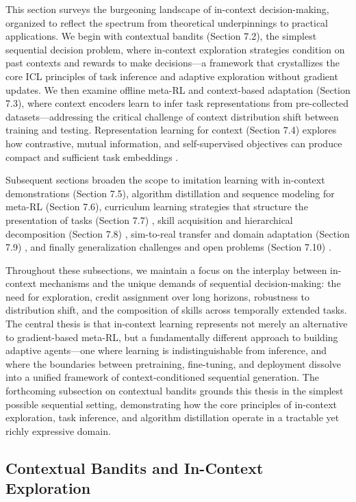 \documentclass[11pt]{article}
\begin{document}
This section surveys the burgeoning landscape of in-context decision-making, organized to reflect the spectrum from theoretical underpinnings to practical applications. We begin with contextual bandits (Section 7.2), the simplest sequential decision problem, where in-context exploration strategies condition on past contexts and rewards to make decisions---a framework that crystallizes the core ICL principles of task inference and adaptive exploration without gradient updates. We then examine offline meta-RL and context-based adaptation (Section 7.3), where context encoders learn to infer task representations from pre-collected datasets---addressing the critical challenge of context distribution shift between training and testing. Representation learning for context (Section 7.4) explores how contrastive, mutual information, and self-supervised objectives can produce compact and sufficient task embeddings \cite{ref318,ref312}.

Subsequent sections broaden the scope to imitation learning with in-context demonstrations (Section 7.5), algorithm distillation and sequence modeling for meta-RL (Section 7.6), curriculum learning strategies that structure the presentation of tasks (Section 7.7) \cite{ref319,ref320}, skill acquisition and hierarchical decomposition (Section 7.8) \cite{ref321}, sim-to-real transfer and domain adaptation (Section 7.9) \cite{ref322}, and finally generalization challenges and open problems (Section 7.10) \cite{ref323,ref324}.

Throughout these subsections, we maintain a focus on the interplay between in-context mechanisms and the unique demands of sequential decision-making: the need for exploration, credit assignment over long horizons, robustness to distribution shift, and the composition of skills across temporally extended tasks. The central thesis is that in-context learning represents not merely an alternative to gradient-based meta-RL, but a fundamentally different approach to building adaptive agents---one where learning is indistinguishable from inference, and where the boundaries between pretraining, fine-tuning, and deployment dissolve into a unified framework of context-conditioned sequential generation. The forthcoming subsection on contextual bandits grounds this thesis in the simplest possible sequential setting, demonstrating how the core principles of in-context exploration, task inference, and algorithm distillation operate in a tractable yet richly expressive domain.

\subsection{Contextual Bandits and In-Context Exploration}
\end{document}
